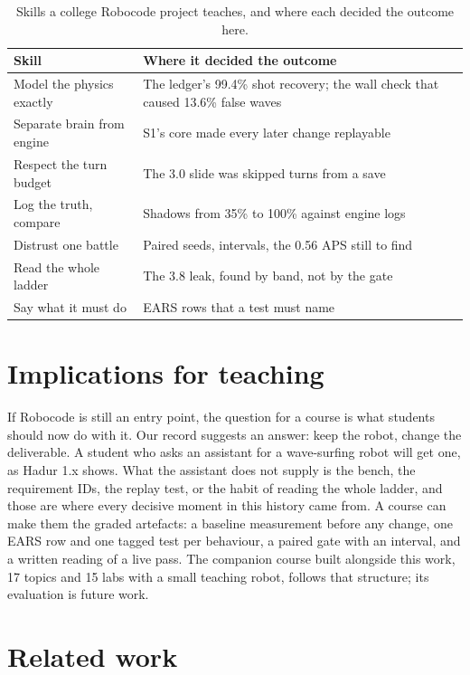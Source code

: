 \documentclass[10pt,twocolumn]{article}
\begin{document}
\begin{table}[t]
\centering
\caption{Skills a college Robocode project teaches, and where each decided the outcome here.}
\label{tab:skills}
\small
\begin{tabularx}{\columnwidth}{@{}>{\raggedright\arraybackslash}p{}>{\raggedright\arraybackslash}X@{}}
\toprule
Skill & Where it decided the outcome \\
\midrule
Model the physics exactly & The ledger's 99.4\% shot recovery; the wall check that caused 13.6\% false waves \\
Separate brain from engine & S1's core made every later change replayable \\
Respect the turn budget & The 3.0 slide was skipped turns from a save \\
Log the truth, compare & Shadows from 35\% to 100\% against engine logs \\
Distrust one battle & Paired seeds, intervals, the 0.56 APS still to find \\
Read the whole ladder & The 3.8 leak, found by band, not by the gate \\
Say what it must do & EARS rows that a test must name \\
\bottomrule
\end{tabularx}
\end{table}

\section{Implications for teaching}

If Robocode is still an entry point, the question for a course is what students should now do
with it. Our record suggests an answer: keep the robot, change the deliverable. A student who
asks an assistant for a wave-surfing robot will get one, as Hadur 1.x shows. What the assistant
does not supply is the bench, the requirement IDs, the replay test, or the habit of reading the
whole ladder, and those are where every decisive moment in this history came from. A course can
make them the graded artefacts: a baseline measurement before any change, one EARS row and one
tagged test per behaviour, a paired gate with an interval, and a written reading of a live pass.
The companion course built alongside this work, 17 topics and 15 labs with a small teaching
robot, follows that structure; its evaluation is future work.

\section{Related work}
\end{document}
